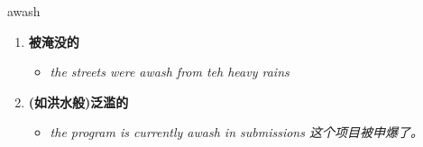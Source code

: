 
\begin{frame}
{\huge awash}
\begin{center}
\begin{enumerate}\Large
  \item \textbf{被淹没的}
  \begin{itemize}
    \item \em{\Large{the streets were awash from teh heavy rains}}
  \end{itemize}
  \item \textbf{(如洪水般)泛滥的}
  \begin{itemize}
    \item \em{\Large{the program is currently awash in submissions 这个项目被申爆了。}}
  \end{itemize}
\end{enumerate}
\end{center}
\end{frame}
